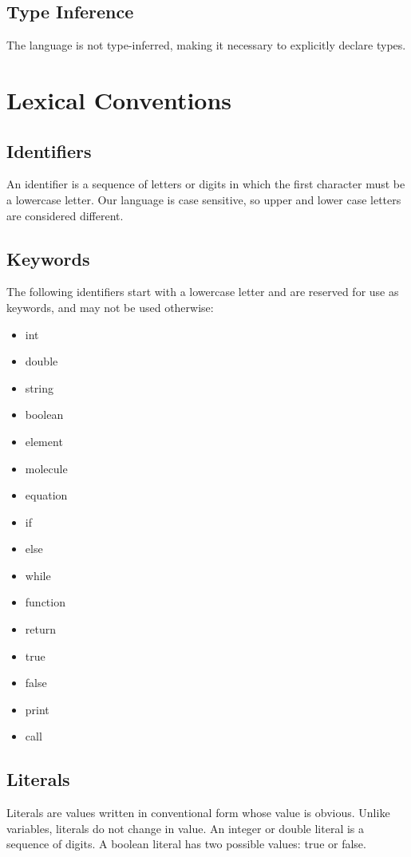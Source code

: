 \documentclass[11pt]{report}
\begin{document}
\subsection{Type Inference}
The language is not type-inferred, making it necessary to explicitly declare types.

\section{Lexical Conventions}
\subsection{Identifiers}
An identifier is a sequence of letters or digits in which the first character must be a lowercase letter. Our language is case sensitive, so upper and lower case letters are considered different.

\subsection{Keywords}
The following identifiers start with a lowercase letter and are reserved for use as keywords, and may not be used otherwise:
\begin{multicols}{3}
 \begin{itemize}
 \item int
 \item double
 \item string
 \item boolean
 \item element
 \item molecule
 \item equation
 \item if
 \item else
 \item while
 \item function
 \item return
 \item true
 \item false
 \item print
 \item call
 \end{itemize}
\end{multicols}

\subsection{Literals}
Literals are values written in conventional form whose value is obvious. Unlike variables, literals do not change in value. An integer or double literal is a sequence of digits. A boolean literal has two possible values: true or false.
\end{document}
